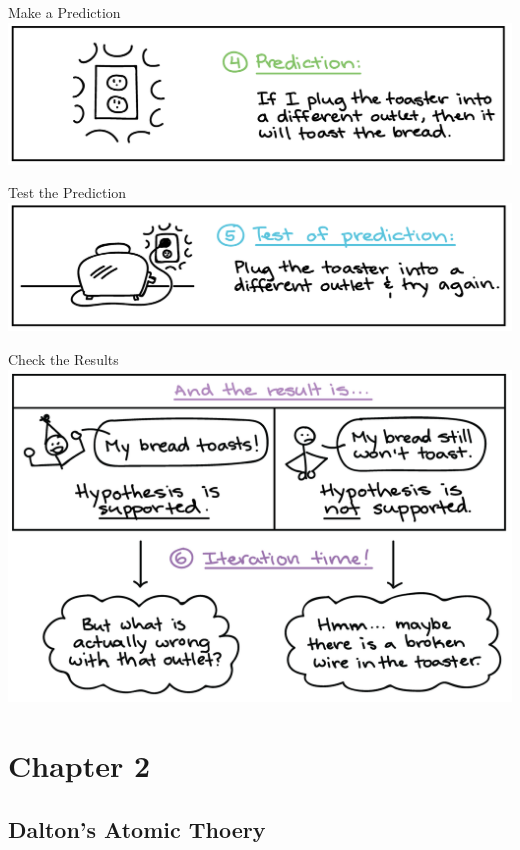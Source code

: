 \documentclass[11pt]{beamer}
\begin{document}
\begin{frame}{Make a Prediction}
  \centering
  \includegraphics[scale=1]{toast_predict}
\end{frame}

\begin{frame}{Test the Prediction}
  \centering
  \includegraphics[scale=1]{toast_exp}
\end{frame}

\begin{frame}{Check the Results}
  \centering
  \includegraphics[scale=1]{toast_iterate}
\end{frame}

\section{Chapter 2}

\subsection{Dalton's Atomic Thoery}
\end{document}
